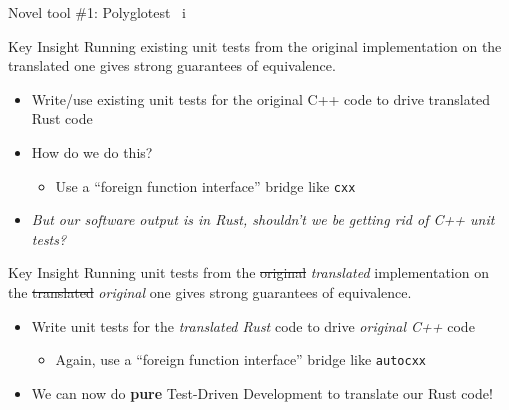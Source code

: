 \documentclass[10pt,aspectratio=169]{beamer}
\begin{document}
\begin{frame}{Novel tool \#1: Polyglotest \ i}
    \begin{overprint}
            \begin{alertblock}{Key Insight}
                \vspace*{0.25cm}
                Running existing unit tests from the original implementation on the translated one gives strong guarantees of equivalence.
            \end{alertblock}
            \vspace*{1cm}
            \begin{itemize}
                \item Write/use existing unit tests for the original C++ code to drive translated Rust code
                \item How do we do this?
                \begin{itemize}
                    \item<2-> Use a ``foreign function interface'' bridge like \texttt{cxx}
                \end{itemize}
                \item<3-> \textit{But our software output is in Rust, shouldn't we be getting rid of C++ unit tests?}
            \end{itemize}
            \begin{alertblock}{Key Insight}
                \vspace*{0.25cm}
                Running unit tests from the \sout{original} \textit{translated} implementation on the \sout{translated} \textit{original} one gives strong guarantees of equivalence.
            \end{alertblock}
            \vspace*{1cm}
            \begin{itemize}
                \item Write unit tests for the \textit{translated Rust} code to drive \textit{original C++} code
                \begin{itemize}
                    \item Again, use a ``foreign function interface'' bridge like \texttt{autocxx}
                \end{itemize}
                \vspace*{0.5cm}
                \item<5-> \alert{We can now do \textbf{pure} Test-Driven Development to translate our Rust code!}
            \end{itemize}
    \end{overprint}

\end{frame}
\end{document}
